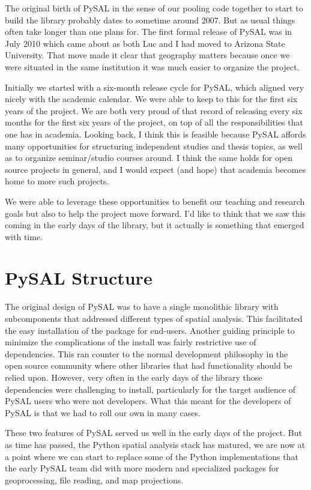 \documentclass[11pt]{article}
\begin{document}
The original birth of PySAL in the sense of our pooling code together to start
to build the library probably dates to sometime around 2007. But as
usual things often take longer than one plans for. The first formal release of
PySAL was in July 2010 which came about as both Luc and I had moved to Arizona
State University. That move made it clear that geography matters because once
we were situated in the same institution it was much easier to organize the
project.

Initially we started with a six-month release cycle for PySAL, which aligned
very nicely with the academic calendar. We were able to keep to this for the
first six years of the project. We are both very proud of that record of
releasing every six months for the first six years of the project, on top of
all the responsibilities that one has in academia. Looking back, I think this
is feasible because PySAL affords many opportunities for structuring
independent studies and thesis topics, as well as to organize seminar/studio
courses around. I think the same holds for open source projects in general, and
I would expect (and hope) that academia becomes home to more such projects.

We were able to leverage these opportunities to benefit our teaching and
research goals but also to help the project move forward. I'd like to think
that we saw this coming in the early days of the library, but it actually is
something that emerged with time.
\section{PySAL Structure}
\label{sec:orgc598589}
The original design of PySAL was to have a single monolithic library with
subcomponents that addressed different types of spatial analysis. This
facilitated the easy installation of the package for end-users. Another guiding
principle to minimize the complications of the install was fairly restrictive
use of dependencies. This ran counter to the normal development philosophy in
the open source community where other libraries that had functionality should be
relied upon. However, very often in the early days of the library 
those dependencies were challenging to install, particularly for the target
audience of PySAL users who were not developers. What this meant for the
developers of PySAL is that we had to roll our own in many cases.

These two features of PySAL served us well in the early days of the project.
But as time has passed, the Python spatial analysis stack has matured, we are
now at a point where we can start to replace some of the Python implementations
that the early PySAL team did with more modern and specialized packages for
geoprocessing, file reading, and map projections.
\end{document}
